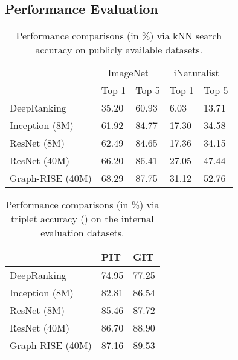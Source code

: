 \documentclass[sigconf]{acmart}
\begin{document}
\subsection{Performance Evaluation}
\begin{table}[t]
\begin{tabular}{l|ll|ll}
                 & \multicolumn{2}{c}{ImageNet~\cite{krizhevsky2012imagenet}}  & \multicolumn{2}{c}{iNaturalist~\cite{van2018inaturalist}}      \\
                 & \multicolumn{1}{c}{Top-1} & \multicolumn{1}{c}{Top-5} & \multicolumn{1}{c}{Top-1} & \multicolumn{1}{c}{Top-5} \\ \hline
DeepRanking     & 35.20                      & 60.93                     & 6.03                      & 13.71                     \\
Inception (8M)   & 61.92                      & 84.77                   & 17.30                     & 34.58                     \\
ResNet (8M)      & 62.49                     & 84.65                     & 17.36                     & 34.15                     \\
ResNet (40M)     & 66.20                      & 86.41                     & 27.05                     & 47.44                     \\
Graph-RISE (40M)     & 68.29                     & 87.75                     & 31.12                     & 52.76                    
\end{tabular}
\caption{Performance comparisons (in \%) via kNN search accuracy on publicly available datasets.}
\label{tab:exp_knn}
\end{table}

\begin{table}[tbp]
\begin{tabular}{l|ll}
                 & PIT  &  GIT     \\ \hline
DeepRanking & 74.95              &  77.25            \\        
Inception (8M)   & 82.81                  & 86.54                       \\
ResNet (8M)      & 85.46                     & 87.72                     \\
ResNet (40M)     & 86.70                      & 88.90                    \\
Graph-RISE (40M)     & 87.16                & 89.53                    \\
\end{tabular}
\caption{Performance comparisons (in \%) via triplet accuracy () on the internal evaluation datasets.}
\label{tab:exp_triplet}
\end{table}
\end{document}
